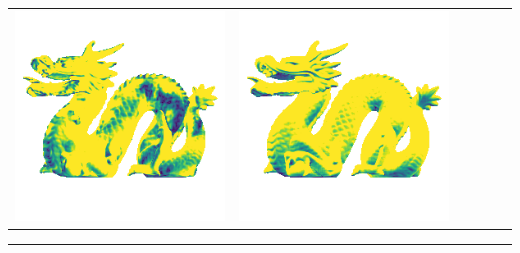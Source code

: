 \begin{center}
\begin{tabularx}{\linewidth}{@{}Y@{}Y@{}Y@{}Y@{}Y@{}Y@{}}
\includegraphics[width=\linewidth]{semisynthetic/20150514_21_marrnet_err.png} &
\includegraphics[width=\linewidth]{semisynthetic/20150514_21_ef_err.png} \\
\end{tabularx}
\begin{center}\rule{0.5\linewidth}{\linethickness}\end{center}


\end{center}

